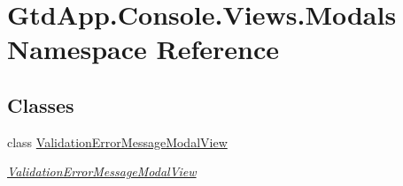 \hypertarget{namespace_gtd_app_1_1_console_1_1_views_1_1_modals}{}\section{Gtd\+App.\+Console.\+Views.\+Modals Namespace Reference}
\label{namespace_gtd_app_1_1_console_1_1_views_1_1_modals}
\subsection*{Classes}
\begin{DoxyCompactItemize}
\item 
class \mbox{\hyperlink{class_gtd_app_1_1_console_1_1_views_1_1_modals_1_1_validation_error_message_modal_view}{Validation\+Error\+Message\+Modal\+View}}
\begin{DoxyCompactList}\small\item\em \mbox{\hyperlink{class_gtd_app_1_1_console_1_1_views_1_1_modals_1_1_validation_error_message_modal_view}{Validation\+Error\+Message\+Modal\+View}} \end{DoxyCompactList}\end{DoxyCompactItemize}
